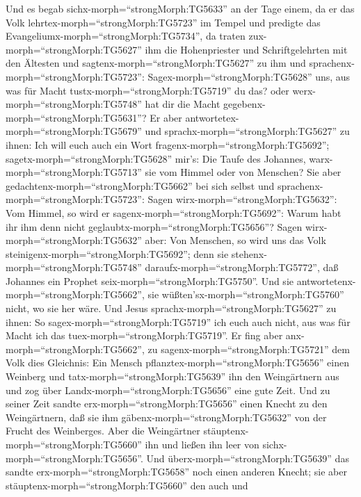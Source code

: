  Und es begab sichx-morph=``strongMorph:TG5633'' an der Tage
einem, da er das Volk lehrtex-morph=``strongMorph:TG5723'' im Tempel und
predigte das Evangeliumx-morph=``strongMorph:TG5734'', da traten
zux-morph=``strongMorph:TG5627'' ihm die Hohenpriester und
Schriftgelehrten mit den Ältesten  und
sagtenx-morph=``strongMorph:TG5627'' zu ihm und
sprachenx-morph=``strongMorph:TG5723'':
Sagex-morph=``strongMorph:TG5628'' uns, aus was für Macht
tustx-morph=``strongMorph:TG5719'' du das? oder
werx-morph=``strongMorph:TG5748'' hat dir die Macht
gegebenx-morph=``strongMorph:TG5631''?  Er aber
antwortetex-morph=``strongMorph:TG5679'' und
sprachx-morph=``strongMorph:TG5627'' zu ihnen: Ich will euch auch ein
Wort fragenx-morph=``strongMorph:TG5692'';
sagetx-morph=``strongMorph:TG5628'' mir's:  Die Taufe des
Johannes, warx-morph=``strongMorph:TG5713'' sie vom Himmel oder von
Menschen?  Sie aber gedachtenx-morph=``strongMorph:TG5662''
bei sich selbst und sprachenx-morph=``strongMorph:TG5723'': Sagen
wirx-morph=``strongMorph:TG5632'': Vom Himmel, so wird er
sagenx-morph=``strongMorph:TG5692'': Warum habt ihr ihm denn nicht
geglaubtx-morph=``strongMorph:TG5656''?  Sagen
wirx-morph=``strongMorph:TG5632'' aber: Von Menschen, so wird uns das
Volk steinigenx-morph=``strongMorph:TG5692''; denn sie
stehenx-morph=``strongMorph:TG5748''
daraufx-morph=``strongMorph:TG5772'', daß Johannes ein Prophet
seix-morph=``strongMorph:TG5750''.  Und sie
antwortetenx-morph=``strongMorph:TG5662'', sie
wüßten'sx-morph=``strongMorph:TG5760'' nicht, wo sie her wäre.
 Und Jesus sprachx-morph=``strongMorph:TG5627'' zu ihnen: So
sagex-morph=``strongMorph:TG5719'' ich euch auch nicht, aus was für
Macht ich das tuex-morph=``strongMorph:TG5719''.  Er fing
aber anx-morph=``strongMorph:TG5662'', zu
sagenx-morph=``strongMorph:TG5721'' dem Volk dies Gleichnis: Ein Mensch
pflanztex-morph=``strongMorph:TG5656'' einen Weinberg und
tatx-morph=``strongMorph:TG5639'' ihn den Weingärtnern aus und zog über
Landx-morph=``strongMorph:TG5656'' eine gute Zeit.  Und zu
seiner Zeit sandte erx-morph=``strongMorph:TG5656'' einen Knecht zu den
Weingärtnern, daß sie ihm gäbenx-morph=``strongMorph:TG5632'' von der
Frucht des Weinberges. Aber die Weingärtner
stäuptenx-morph=``strongMorph:TG5660'' ihn und ließen ihn leer von
sichx-morph=``strongMorph:TG5656''.  Und
überx-morph=``strongMorph:TG5639'' das sandte
erx-morph=``strongMorph:TG5658'' noch einen anderen Knecht; sie aber
stäuptenx-morph=``strongMorph:TG5660'' den auch und

